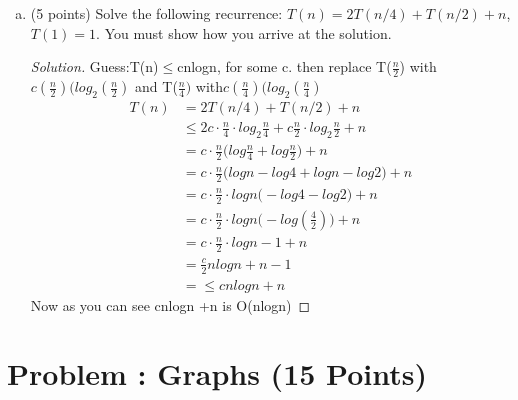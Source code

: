 \documentclass[12pt]{amsart}
\newcounter{pNum}
\newcommand{\problem}[2]{\addtocounter{pNum}{1}
\section*{Problem \arabic{pNum}: #1 (#2 Points)}}
\begin{document}
\begin{enumerate}[(a)]
\item (5 points)
Solve the following recurrence: $T(n) = 2T(n/4) + T(n/2) + n$, $T(1) = 1$.
You must show how you arrive at the solution.
\begin{proof}[Solution]
Guess:T(n)$\leq$cnlogn, for some c. then replace T($\frac{n}{2}$) with $c(\frac{n}{2})(log_2(\frac{n}{2}) $ and T($\frac{n}{4})$ with$c(\frac{n}{4})(log_2(\frac{n}{4})$\\
\begin{align*}
T(n) &= 2T(n/4) + T(n/2) + n \\
&\leq 2c \cdot \frac{n}{4} \cdot log_2\frac{n}{4} + c\frac{n}{2} \cdot log_2\frac{n}{2} + n\\
&=c \cdot \frac{n}{2} \bigg(  log\frac{n}{4} + log\frac{n}{2}\bigg) + n\\
&= c \cdot \frac{n}{2}  \bigg( logn - log4 + logn - log2
 \bigg) + n\\
 &= c \cdot \frac{n}{2} \cdot logn \bigg(  - log4  - log2
 \bigg) + n\\
 &= c \cdot \frac{n}{2} \cdot logn \bigg(  - log( \frac{4}{2})
 \bigg) + n\\
  &= c \cdot \frac{n}{2} \cdot logn  - 1 + n\\
  &= \frac{c}{2}nlogn +n - 1\\
  &= \leq cnlogn +n
\end{align*}
Now as you can see cnlogn +n is O(nlogn)
\end{proof}
\end{enumerate}


\newpage

\problem{Graphs}{15}
\end{document}
